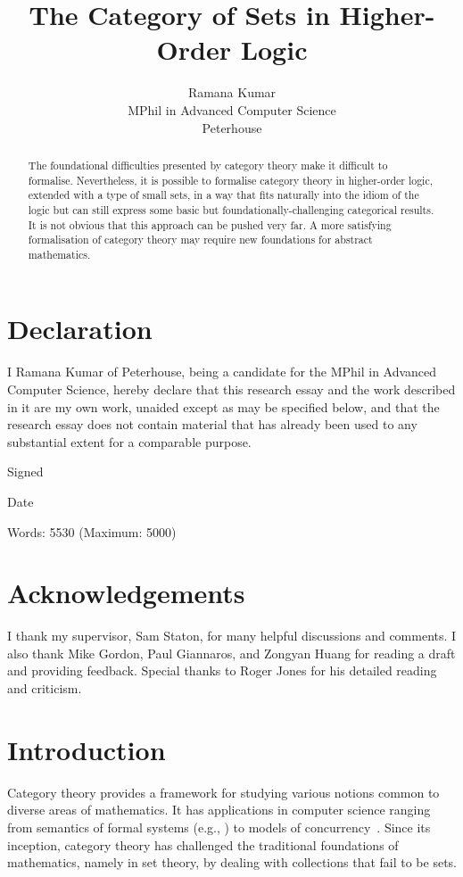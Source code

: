 \documentclass[twoside,titlepage,11pt]{article}
\title{The Category of Sets in Higher-Order Logic}
\author{Ramana Kumar\\MPhil in Advanced Computer Science\\Peterhouse}
\begin{document}
\maketitle
\section*{Declaration}%
\thispagestyle{empty}
I Ramana Kumar of Peterhouse, being a candidate for the MPhil in Advanced Computer Science, hereby declare that this research essay and the work described in it are my own work, unaided except as may be specified below, and that the research essay does not contain material that has already been used to any substantial extent for a comparable purpose.

\vspace{1em}
\noindent Signed

\vspace{1em}
\noindent Date

\vspace{2em}
\noindent Words: 5530 (Maximum: 5000)
\vspace{5em}
\section*{Acknowledgements}%
I thank my supervisor, Sam Staton, for many helpful discussions and comments.
I also thank Mike Gordon, Paul Giannaros, and Zongyan Huang for reading a draft and providing feedback.
Special thanks to Roger Jones for his detailed reading and criticism.
\begin{abstract}%
The foundational difficulties presented by category theory make it difficult to formalise.
Nevertheless, it is possible to formalise category theory in higher-order logic, extended with a type of small sets, in a way that fits naturally into the idiom of the logic but can still express some basic but foundationally-challenging categorical results.
It is not obvious that this approach can be pushed very far.
A more satisfying formalisation of category theory may require new foundations for abstract mathematics.
\end{abstract}%
\section{Introduction}%
Category theory provides a framework for studying various notions common to diverse areas of mathematics.
It has applications in computer science ranging from semantics of formal systems (e.g., \cite{CroleCT,JacobsCLTT}) to models of concurrency~\cite{DBLP:conf/csl/CattaniW96}.
Since its inception, category theory has challenged the traditional foundations of mathematics, namely in set theory, by dealing with collections that fail to be sets.
\end{document}

